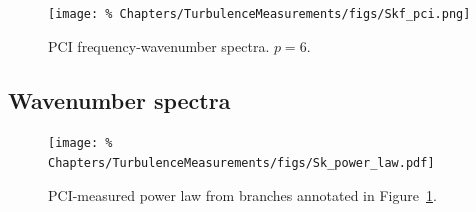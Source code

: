 \begin{figure}
  \centering
  \texttt{[image: \%
    Chapters/TurbulenceMeasurements/figs/Skf\_pci.png]}
  \caption[PCI frequency-wavenumber spectra]{%
    PCI frequency-wavenumber spectra. $p = 6$.
  }
\label{fig:TurbulenceMeasurements:Skf_pci}
\end{figure}


\subsection{Wavenumber spectra}
\label{sec:TurbulenceMeasurements:Sk}
\begin{figure}
  \centering
  \texttt{[image: \%
    Chapters/TurbulenceMeasurements/figs/Sk\_power\_law.pdf]}
  \caption[PCI-measured power law]{%
    PCI-measured power law from branches annotated in
    Figure~\ref{fig:TurbulenceMeasurements:Skf_pci}.
  }
\label{fig:TurbulenceMeasurements:Sk_power_law}
\end{figure}



